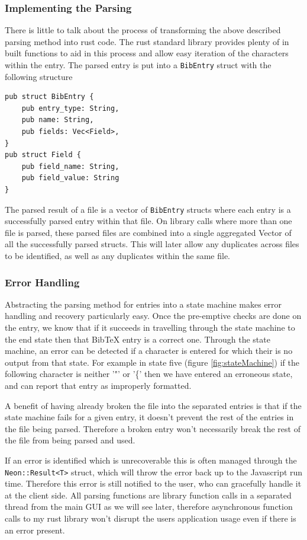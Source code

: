 \documentclass[a4paper,11pt]{article}
\newcommand{\code}[1]{\colorbox{codegray}{\texttt{#1}}}
\begin{document}
\subsubsection{Implementing the Parsing}
There is little to talk about the process of transforming the above described parsing method into rust code. The rust standard library provides plenty of in built functions to aid in this process and allow easy iteration of the characters within the entry. The parsed entry is put into a \code{BibEntry} struct with the following structure
\begin{verbatim}
pub struct BibEntry {
    pub entry_type: String,
    pub name: String,
    pub fields: Vec<Field>,
}
pub struct Field {
    pub field_name: String,
    pub field_value: String
}
\end{verbatim}
The parsed result of a file is a vector of \code{BibEntry} structs where each entry is a successfully parsed entry within that file. On library calls where more than one file is parsed, these parsed files are combined into a single aggregated Vector of all the successfully parsed structs. This will later allow any duplicates across files to be identified, as well as any duplicates within the same file. 

\subsubsection{Error Handling}

Abstracting the parsing method for entries into a state machine makes error handling and recovery particularly easy. Once the pre-emptive checks are done on the entry, we know that if it succeeds in travelling through the state machine to the end state then that BibTeX entry is a correct one. Through the state machine, an error can be detected if a character is entered for which their is no output from that state. For example in state five (figure \ref{fig:stateMachine}) if the following character is neither '"' or '\{' then we have entered an erroneous state, and can report that entry as improperly formatted.

A benefit of having already broken the file into the separated entries is that if the state machine fails for a given entry, it doesn't prevent the rest of the entries in the file being parsed. Therefore a broken entry won't necessarily break the rest of the file from being parsed and used.

If an error is identified which is unrecoverable this is often managed through the \code{Neon::Result<T>} struct, which will throw the error back up to the Javascript run time. Therefore this error is still notified to the user, who can gracefully handle it at the client side. All parsing functions are library function calls in a separated thread from the main GUI as we will see later, therefore asynchronous function calls to my rust library won't disrupt the users application usage even if there is an error present.
\end{document}
